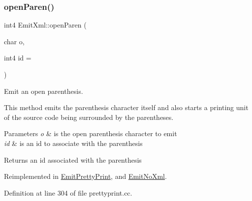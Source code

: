 \subsubsection{\texorpdfstring{openParen()}{openParen()}}
{\footnotesize\ttfamily int4 Emit\+Xml\+::open\+Paren (\begin{DoxyParamCaption}\item[{char}]{o,  }\item[{int4}]{id = {} }\end{DoxyParamCaption})\hspace{0.3cm}{\ttfamily [virtual]}}



Emit an open parenthesis. 

This method emits the parenthesis character itself and also starts a printing unit of the source code being surrounded by the parentheses. 
\begin{DoxyParams}{Parameters}
{\em o} & is the open parenthesis character to emit \\
\hline
{\em id} & is an id to associate with the parenthesis \\
\hline
\end{DoxyParams}
\begin{DoxyReturn}{Returns}
an id associated with the parenthesis 
\end{DoxyReturn}


Reimplemented in \mbox{\hyperlink{class_emit_pretty_print_a45992e62b83097eccbd431e1957f2108}{Emit\+Pretty\+Print}}, and \mbox{\hyperlink{class_emit_no_xml_a9a41693087659b738ccdeadaa16d886b}{Emit\+No\+Xml}}.



Definition at line 304 of file prettyprint.\+cc.

